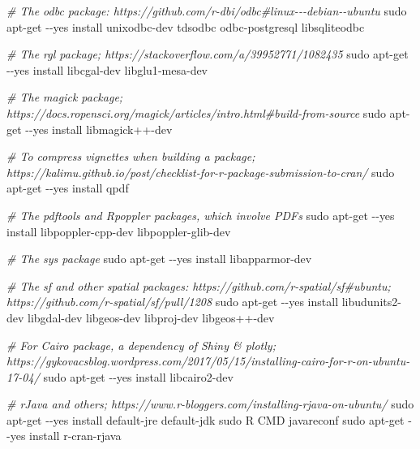 \documentclass[
]{book}
\newenvironment{Shaded}{\begin{snugshade}}{\end{snugshade}}
\newcommand{\CommentTok}[1]{\textcolor[rgb]{0.56,0.35,0.01}{\textit{#1}}}
\newcommand{\FunctionTok}[1]{\textcolor[rgb]{0.00,0.00,0.00}{#1}}
\newcommand{\NormalTok}[1]{#1}
\newcommand{\StringTok}[1]{\textcolor[rgb]{0.31,0.60,0.02}{#1}}
\begin{document}
\begin{Shaded}
\begin{Highlighting}[]
  \CommentTok{\# The \textquotesingle{}odbc\textquotesingle{} package: https://github.com/r{-}dbi/odbc\#linux{-}{-}{-}debian{-}{-}ubuntu}
  \FunctionTok{sudo}\NormalTok{ apt{-}get {-}{-}yes install unixodbc{-}dev tdsodbc odbc{-}postgresql libsqliteodbc}

  \CommentTok{\# The \textquotesingle{}rgl\textquotesingle{} package; https://stackoverflow.com/a/39952771/1082435}
  \FunctionTok{sudo}\NormalTok{ apt{-}get {-}{-}yes install libcgal{-}dev libglu1{-}mesa{-}dev}

  \CommentTok{\# The \textquotesingle{}magick\textquotesingle{} package; https://docs.ropensci.org/magick/articles/intro.html\#build{-}from{-}source}
  \FunctionTok{sudo}\NormalTok{ apt{-}get {-}{-}yes install }\StringTok{\textquotesingle{}libmagick++{-}dev\textquotesingle{}}

  \CommentTok{\# To compress vignettes when building a package; https://kalimu.github.io/post/checklist{-}for{-}r{-}package{-}submission{-}to{-}cran/}
  \FunctionTok{sudo}\NormalTok{ apt{-}get {-}{-}yes install qpdf}

  \CommentTok{\# The \textquotesingle{}pdftools\textquotesingle{} and \textquotesingle{}Rpoppler\textquotesingle{} packages, which involve PDFs}
  \FunctionTok{sudo}\NormalTok{ apt{-}get {-}{-}yes install libpoppler{-}cpp{-}dev libpoppler{-}glib{-}dev}

  \CommentTok{\# The \textquotesingle{}sys\textquotesingle{} package}
  \FunctionTok{sudo}\NormalTok{ apt{-}get {-}{-}yes install libapparmor{-}dev}

  \CommentTok{\# The \textquotesingle{}sf\textquotesingle{} and other spatial packages: https://github.com/r{-}spatial/sf\#ubuntu; https://github.com/r{-}spatial/sf/pull/1208}
  \FunctionTok{sudo}\NormalTok{ apt{-}get {-}{-}yes install libudunits2{-}dev libgdal{-}dev libgeos{-}dev libproj{-}dev libgeos++{-}dev}
  
  \CommentTok{\# For Cairo package, a dependency of Shiny \& plotly; https://gykovacsblog.wordpress.com/2017/05/15/installing{-}cairo{-}for{-}r{-}on{-}ubuntu{-}17{-}04/}
  \FunctionTok{sudo}\NormalTok{ apt{-}get {-}{-}yes install libcairo2{-}dev}

  \CommentTok{\# \textquotesingle{}rJava\textquotesingle{} and others; https://www.r{-}bloggers.com/installing{-}rjava{-}on{-}ubuntu/}
  \FunctionTok{sudo}\NormalTok{ apt{-}get {-}{-}yes install default{-}jre default{-}jdk}
  \FunctionTok{sudo}\NormalTok{ R CMD javareconf}
  \FunctionTok{sudo}\NormalTok{ apt{-}get {-}{-}yes install r{-}cran{-}rjava}


\end{Highlighting}
\end{Shaded}
\end{document}
